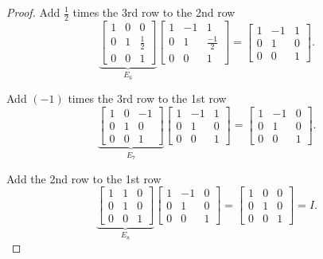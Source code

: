 \begin{proof}
    Add $\frac{1}{2}$ times the 3rd row to the 2nd row
    \[
        \underbrace{\begin{bmatrix}
                1 & 0 & 0           \\
                0 & 1 & \frac{1}{2} \\
                0 & 0 & 1
            \end{bmatrix}}_{E_{6}}
        \begin{bmatrix}
            1 & -1 & 1            \\
            0 & 1  & \frac{-1}{2} \\
            0 & 0  & 1
        \end{bmatrix}
        =
        \begin{bmatrix}
            1 & -1 & 1 \\
            0 & 1  & 0 \\
            0 & 0  & 1
        \end{bmatrix}.
    \]

    Add $(-1)$ times the 3rd row to the 1st row
    \[
        \underbrace{\begin{bmatrix}
                1 & 0 & -1 \\
                0 & 1 & 0  \\
                0 & 0 & 1
            \end{bmatrix}}_{E_{7}}
        \begin{bmatrix}
            1 & -1 & 1 \\
            0 & 1  & 0 \\
            0 & 0  & 1
        \end{bmatrix}
        =
        \begin{bmatrix}
            1 & -1 & 0 \\
            0 & 1  & 0 \\
            0 & 0  & 1
        \end{bmatrix}.
    \]

    Add the 2nd row to the 1st row
    \[
        \underbrace{\begin{bmatrix}
                1 & 1 & 0 \\
                0 & 1 & 0 \\
                0 & 0 & 1
            \end{bmatrix}}_{E_{8}}
        \begin{bmatrix}
            1 & -1 & 0 \\
            0 & 1  & 0 \\
            0 & 0  & 1
        \end{bmatrix}
        =
        \begin{bmatrix}
            1 & 0 & 0 \\
            0 & 1 & 0 \\
            0 & 0 & 1
        \end{bmatrix} = I.
    \]
\end{proof}

